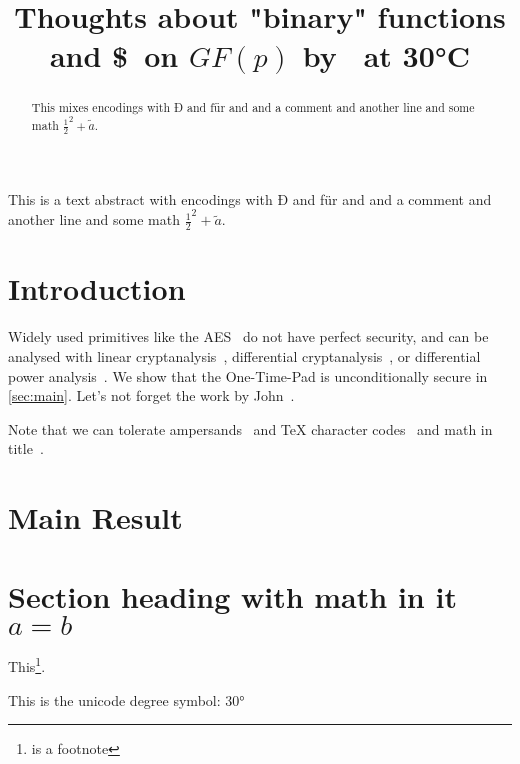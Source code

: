 \documentclass[version=final]{iacrcc}
\title[running={Thoughts on binary functions},
       plaintext={Thoughts about "binary" functions and \$\ on $GF(p)$ by Fester Bestertester at 30°C}]
      {Thoughts about "binary" functions and \$\ on $GF(p)$ by \niceguy\ at 30°C}
\begin{document}
\maketitle

\begin{abstract}
  This mixes encodings with Ð and f\"ur and \th and a comment %
and another line and some math \(\frac{1}{2}^2 + \tilde{a}\).

  \lipsum[8]
\end{abstract}
\begin{textabstract}
This is a text abstract with encodings with Ð and f\"ur and \th and a comment %
and another line and some math \(\frac{1}{2}^2 + \tilde{a}\).
\end{textabstract}


\section{Introduction}

Widely used primitives like the AES~\cite{AES} do not have perfect
security, and can be analysed with linear
cryptanalysis~\cite{EC:Matsui93}, differential
cryptanalysis~\cite{JC:BihSha91}, or differential power
analysis~\cite{C:KocJafJun99}.  We show that the One-Time-Pad is
unconditionally secure in \autoref{sec:main}. Let's not forget
the work by John~\cite{vonNeumann}.

Note that we can tolerate ampersands~\cite{Dalheimer02} and \TeX
character codes~\cite{Bohme10} and math in
title~\cite{ACISP:MurPla19,ACISP:LYLF19,ACISP:WeiSteSha03,CCS:BHKNRS19,ACNS:DurHugVau20}.

\lipsum[9]

\section{Main Result}\label{sec:main}

\lipsum

\section{Section heading with math in it $a=b$}
\lipsum

This\footnote{is a footnote}.

This is the unicode degree symbol: 30°

\end{document}
